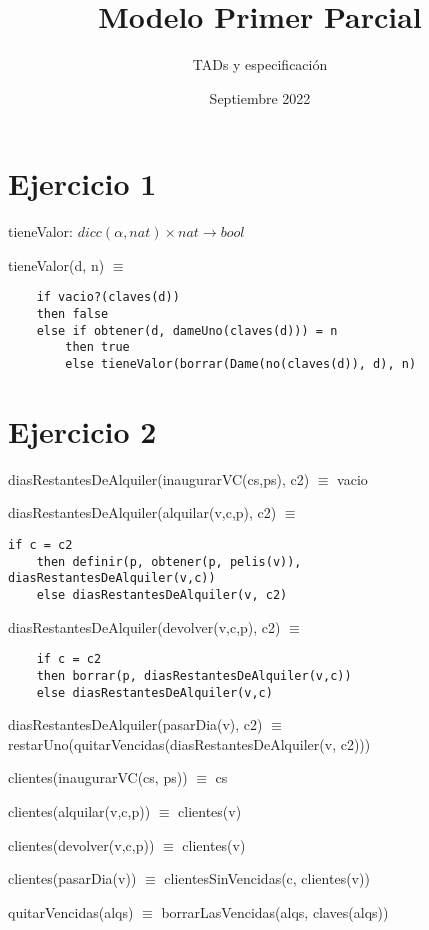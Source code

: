 
\setlength{\parindent}{0pt}

\title{Modelo Primer Parcial}
\author{TADs y especificación}
\date{Septiembre 2022}



\maketitle

\section{Ejercicio 1}

tieneValor: $dicc(\alpha, nat) \times nat \rightarrow bool$

tieneValor(d, n) $\equiv $
\begin{lstlisting}
    if vacio?(claves(d))
    then false
    else if obtener(d, dameUno(claves(d))) = n
        then true
        else tieneValor(borrar(Dame(no(claves(d)), d), n)
\end{lstlisting}
\section{Ejercicio 2}

diasRestantesDeAlquiler(inaugurarVC(cs,ps), c2) $\equiv$ vacio

diasRestantesDeAlquiler(alquilar(v,c,p), c2) $\equiv$ 
\begin{lstlisting}
if c = c2
    then definir(p, obtener(p, pelis(v)), diasRestantesDeAlquiler(v,c))
    else diasRestantesDeAlquiler(v, c2)
\end{lstlisting}

diasRestantesDeAlquiler(devolver(v,c,p), c2) $\equiv$ 
\begin{lstlisting}
    if c = c2
    then borrar(p, diasRestantesDeAlquiler(v,c))
    else diasRestantesDeAlquiler(v,c)
\end{lstlisting}

diasRestantesDeAlquiler(pasarDia(v), c2) $\equiv$ restarUno(quitarVencidas(diasRestantesDeAlquiler(v, c2)))

clientes(inaugurarVC(cs, ps)) $\equiv$ cs

clientes(alquilar(v,c,p)) $\equiv$ clientes(v)

clientes(devolver(v,c,p)) $\equiv$ clientes(v)

clientes(pasarDia(v)) $\equiv$ clientesSinVencidas(c, clientes(v))

quitarVencidas(alqs) $\equiv$ borrarLasVencidas(alqs, claves(alqs))


